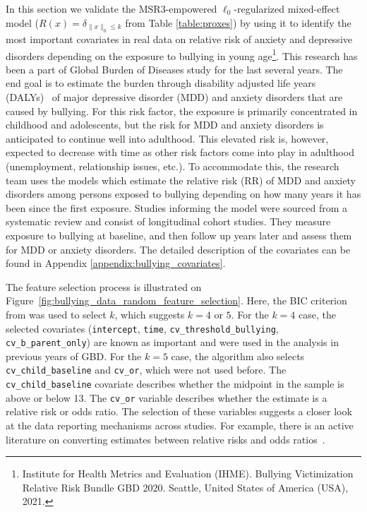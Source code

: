 In this section we validate the MSR3-empowered $\ell_0$-regularized mixed-effect model ($R(x) = \delta_{\|x\|_0 \leq k}$ from Table \ref{table:proxes}) by using it to identify the most important covariates in real data on relative risk of anxiety and depressive disorders depending on the exposure to bullying in young age\footnote{Institute for Health Metrics and Evaluation (IHME). Bullying Victimization Relative Risk Bundle GBD 2020. Seattle, United States of America (USA), 2021.}. This research has been a part of Global Burden of Diseases study for the last several years. The end goal  is to estimate the burden 
{through disability adjusted life years} (DALYs)~\citep{murray1997understanding}
of major depressive disorder (MDD) and anxiety disorders that are caused by bullying. For this risk factor, the exposure is primarily concentrated in childhood and adolescents, but the risk for MDD and anxiety disorders is anticipated to continue well into adulthood. This elevated risk is, however, expected to decrease with time as other risk factors come into play in adulthood (unemployment, relationship issues, etc.). To accommodate this, the research team uses the models which estimate the relative risk (RR) of MDD and anxiety disorders among persons exposed to bullying depending on how many years it has been since the first exposure. Studies informing the model were sourced from a systematic review and consist of longitudinal cohort studies. They measure exposure to bullying at baseline, and then follow up years later and assess them for MDD or anxiety disorders. The detailed description of the covariates can be found in Appendix \ref{appendix:bullying_covariates}.

The feature selection process is illustrated on Figure~\ref{fig:bullying_data_random_feature_selection}. 
Here, the BIC criterion from \cite{Jones2011} was used to select $k$, which suggests $k=4$ or $5$.  
 For the $k=4$ case, the selected covariates (\texttt{intercept}, \texttt{time}, \texttt{cv\_threshold\_bullying}, \texttt{cv\_b\_parent\_only}) 
are known as important and were used in the analysis in previous years of GBD. For the $k=5$ case, 
the algorithm also selects  \texttt{cv\_child\_baseline} and \texttt{cv\_or}, which were not used before. The  \texttt{cv\_child\_baseline} covariate describes whether the midpoint in the sample is above or below 13. 
The  \texttt{cv\_or} variable describes whether the estimate is a relative risk or odds ratio. The selection of these variables suggests a closer look at the data reporting mechanisms across studies. 
For example, there is an active literature on converting estimates between relative risks and odds ratios~\cite{grant2014converting,wang2013converting}.

